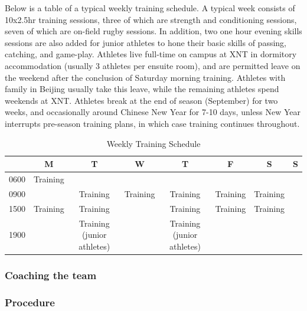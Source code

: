     Below is a table of a typical weekly training schedule. A typical week consists of 10x2.5hr training sessions, three of which are strength and conditioning sessions, seven of which are on-field rugby sessions.  In addition, two one hour evening skills sessions are also added for junior athletes to hone their basic skills of passing, catching, and game-play.  Athletes live full-time on campus at XNT in dormitory accommodation (usually 3 athletes per ensuite room), and are permitted leave on the weekend after the conclusion of Saturday morning training.  Athletes with family in Beijing usually take this leave, while the remaining athletes spend weekends at XNT.  Athletes break at the end of season (September) for two weeks, and occasionally around Chinese New Year for 7-10 days, unless New Year interrupts pre-season training plans, in which case training continues throughout.


    \begin{table}[htpb]\caption{Weekly Training Schedule}
      \begin{center}
        \begin{small}
            \begin{tabular}{| c | c | c | c | c | c | c | c |}
              \hline
              & \bf M & \bf T & \bf W & \bf T & \bf F & \bf S & \bf S \\
              \hline
              0600 & Training &  &  & & & & \\
              \hline
              0900 &  & Training & Training & Training & Training & Training &  \\
                \hline
              1500 & Training & Training & & Training & Training & Training &  \\
                \hline
              1900 &  & Training (junior athletes) & & Training (junior athletes) & & & \\
                 \hline
            \end{tabular}
          \end{small}
        \end{center}
      \end{table}

    \subsubsection{Coaching the team}
    \subsubsection{Procedure} %
